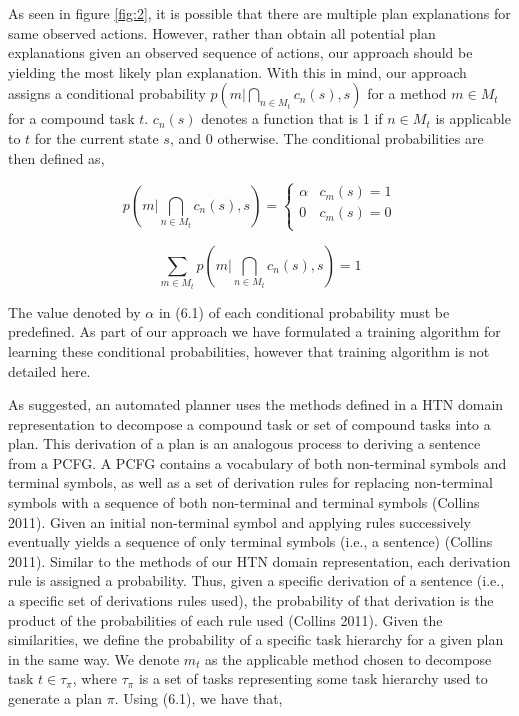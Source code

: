 As seen in figure \ref{fig:2}, it is possible that there are multiple plan explanations for same observed actions. However, rather than obtain all potential plan explanations given an observed sequence of actions, our approach should be yielding the most likely plan explanation. With this in mind, our approach assigns a conditional probability $p(m | \bigcap_{n \in M_t} c_n(s), s)$ for a method $m \in M_t$ for a compound task $t$. $c_n(s)$ denotes a function that is 1 if $n \in M_t$ is applicable to $t$ for the current state $s$, and 0 otherwise. The conditional probabilities are then defined as,

\begin{equation}
p(m | \bigcap_{n \in M_t} c_n(s), s) = \begin{cases} \alpha  & c_m(s) = 1 \\ 0 & c_m(s) = 0 \\ \end{cases}
\end{equation}

\begin{equation}
\sum_{m \in M_t} p(m | \bigcap_{n \in M_t} c_n(s), s) = 1
\end{equation}

The value denoted by $\alpha$ in (6.1) of each conditional probability must be predefined. As part of our approach we have formulated a training algorithm for learning these conditional probabilities, however that training algorithm is not detailed here. 

As suggested, an automated planner uses the methods defined in a HTN domain representation to decompose a compound task or set of compound tasks into a plan. This derivation of a plan is an analogous process to deriving a sentence from a PCFG. A PCFG contains a vocabulary of both non-terminal symbols and terminal symbols, as well as a set of derivation rules for replacing non-terminal symbols with a sequence of both non-terminal and terminal symbols (Collins 2011). Given an initial non-terminal symbol and applying rules successively eventually yields a sequence of only terminal symbols (i.e., a sentence) (Collins 2011). Similar to the methods of our HTN domain representation, each derivation rule is assigned a probability. Thus, given a specific derivation of a sentence (i.e., a specific set of derivations rules used), the probability of that derivation is the product of the probabilities of each rule used (Collins 2011). Given the similarities, we define the probability of a specific task hierarchy for a given plan in the same way. We denote $m_t$ as the applicable method chosen to decompose task $t \in \tau_\pi$, where $\tau_\pi$ is a set of tasks representing some task hierarchy used to generate a plan $\pi$. Using (6.1), we have that,

